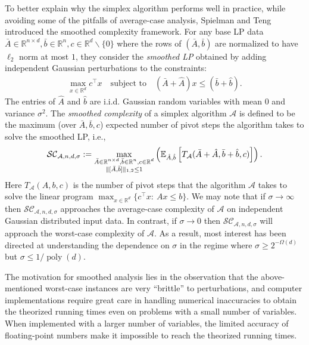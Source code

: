 \documentclass{article}\usepackage[a4paper,margin=20mm]{geometry}
\newcommand{\R}{\mathbb R}
\newcommand{\E}{\mathbb E}
\newcommand{\poly}{\operatorname{poly}}
\begin{document}
To better explain why the simplex algorithm performs well in practice, while avoiding some of the pitfalls
of average-case analysis, Spielman and Teng \cite{ST04} introduced the smoothed complexity framework. 
For any base LP
data $\bar{A} \in \R^{n\times d}, \bar{b}\in \R^n, c\in \R^d \backslash \{0\}$
where the rows of $(\bar A,\bar b)$ are normalized to have $\ell_2$ norm at most $1$, they consider
the \emph{smoothed LP} obtained by adding independent Gaussian perturbations to the
constraints:
\begin{align*}
    \max_{x\in \R^d} c^\top x \quad \text{subject to} \quad (\bar{A} + \hat{A}) x \leq (\bar{b} + \hat{b}).
\end{align*}
The entries of $\hat{A}$ and $\hat{b}$ are i.i.d. Gaussian random variables
with mean $0$ and variance $\sigma^2$. The \emph{smoothed complexity} of a simplex
algorithm $\mathcal{A}$ is defined to be the maximum (over $\bar A, \bar b, c$) expected
number of pivot steps the algorithm takes to solve the smoothed LP, i.e.,
\begin{align*}
    \mathcal{SC}_{\mathcal{A},n,d,\sigma} := \max_{\substack{\bar{A} \in \R^{n\times d}, \bar{b}\in \R^n, c\in \R^d \\ \|[\Bar{A},\Bar{b}]\|_{1, 2} \leq 1}} \left(\E_{\hat{A},\hat{b}}\left[ T_{\mathcal{A}}(\bar{A} + \hat{A}, \bar{b} + \hat{b}, c) \right] \right).
\end{align*}
Here $T_{\mathcal{A}}(A,b,c)$ is the number of pivot steps that the algorithm $\mathcal{A}$ takes to solve the linear program $\max_{x\in \R^d} \{c^\top x:  ~ A x \leq b\}$.
We may note that if $\sigma \to \infty$ then $\mathcal{SC}_{\mathcal A, n, d, \sigma}$
approaches the average-case complexity of $\mathcal{A}$ on independent Gaussian distributed input data.
In contrast, if $\sigma \to 0$ then $\mathcal{SC}_{\mathcal A, n, d, \sigma}$ will approach
the worst-case complexity of $\mathcal A$.
As a result, most interest has been directed at understanding the dependence on $\sigma$
in the regime where $\sigma \geq 2^{-\Omega(d)}$ but $\sigma \leq 1/\poly(d)$.

The motivation for smoothed analysis lies in the observation that the above-mentioned
worst-case instances are very ``brittle'' to perturbations, and computer implementations
require great care in handling numerical inaccuracies to obtain the theorized running times
even on problems with a small number of variables. When implemented with a larger number of
variables, the limited accuracy of floating-point numbers make it impossible to reach
the theorized running times.
\end{document}

